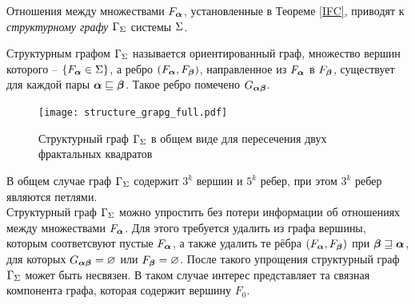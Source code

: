 %
%
%
%
%

Отношения между множествами $F_{\bm{\alpha}}$, установленные в Теореме \ref{IFC}, приводят к {\em структурному графу $\Gamma_\Sigma$} системы $\Sigma$. 

\begin{definition}
Структурным графом $\Gamma_\Sigma$ называется ориентированный граф, множество вершин  которого -- $\{F_{\bm{\alpha}}\in\Sigma\}$, а  ребро $(F_{\bm{\alpha}},F_{\bm{\beta}})$, направленное из $F_{\bm{\alpha}}$ в $F_{\bm{\beta}}$, существует для каждой пары ${\bm{\alpha}}\sqsubseteq{\bm{\beta}}$.  
Такое ребро помечено  $G_{{\bm{\alpha}}{\bm{\beta}}}$.
\end{definition}

\begin{figure}[h!]
    \centering
    \texttt{[image: structure\_grapg\_full.pdf]}
    \caption{Структурный граф $\Gamma_\Sigma$ в общем виде для пересечения двух фрактальных квадратов}
\end{figure}

В общем случае граф $\Gamma_\Sigma$   содержит $3^k$ вершин и $5^k$ ребер, при этом $3^k$ ребер являются петлями.\\

Структурный граф $\Gamma_\Sigma$ можно упростить без потери информации об отношениях между множествами $F_{\bm{\alpha}}$.
Для этого требуется удалить из графа вершины, которым соответсвуют пустые $F_{\bm{\alpha}}$, а также удалить те рёбра $(F_{\bm{\alpha}},F_{\bm{\beta}})$ при ${\bm{\beta}}\sqsupseteq{\bm{\alpha}}$, для которых $G_{{\bm{\alpha}}{\bm{\beta}}}=\varnothing$ или $F_{\bm{\beta}}=\varnothing$.
После такого упрощения структурный граф $\Gamma_\Sigma$ может быть несвязен.
В таком случае интерес представляет та связная компонента графа, которая содержит вершину $F_0$.\\

